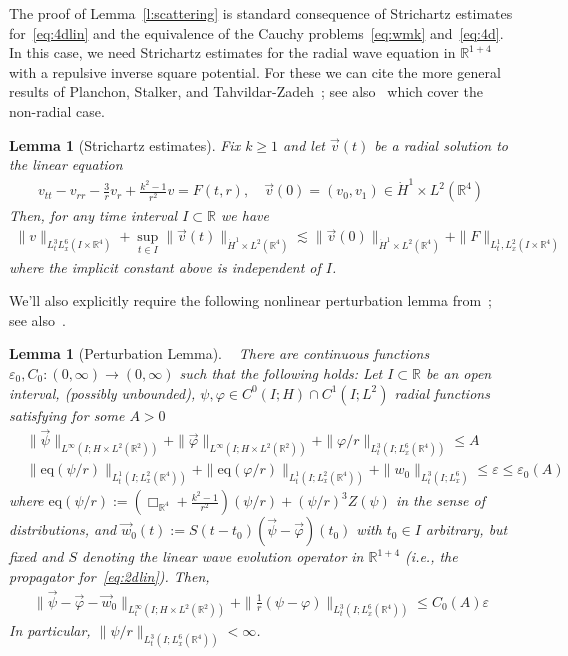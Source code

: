 \documentclass[10pt,reqno]{amsart}
\newcommand{\R}{\mathbb{R}}
\newcommand{\e}{\varepsilon}
\newcommand{\fy}{\varphi}
\newcommand{\I}{\infty}
\newcommand{\EQ}[1]{\begin{equation}\begin{split} #1 \end{split}\end{equation}}
\numberwithin{equation}{section}
\newtheorem{lem}[thm]{Lemma}
\theoremstyle{remark}
\newcommand{\0}{\emptyset}
\begin{document}
The proof of Lemma~\ref{l:scattering} is standard consequence of Strichartz estimates for~\eqref{eq:4dlin} and the equivalence of the Cauchy problems~\eqref{eq:wmk} and~\eqref{eq:4d}.  In this case, we need Strichartz estimates for the radial wave equation in $\R^{1+4}$ with a repulsive inverse square potential. For these we can cite the more general results of Planchon, Stalker, and Tahvildar-Zadeh~\cite{PST03b}; see also~\cite{BPST03, BPST04} which cover the non-radial case.  

\begin{lem}[Strichartz estimates]\emph{ \cite[Corollary 3.9]{PST03b}} \label{l:strich} Fix $k \ge 1$ and let $\vec v(t)$ be a radial solution to the linear equation 
\EQ{
v_{tt}  - v_{rr} - \frac{3}{r} v_r + \frac{k^2 -1}{r^2} v  = F(t, r), \quad \vec v(0) = (v_0, v_1) \in \dot{H}^1 \times L^2 (\R^4)
}
Then, for any time interval $I \subset \R$ we have 
\EQ{ \label{eq:strich} 
\| v \|_{L^{3}_t L^6_x(I \times \R^4)} + \sup_{t \in I}\| \vec v(t) \|_{\dot{H}^1 \times L^2(\R^4)} \lesssim   \| \vec v(0) \|_{\dot{H}^1 \times L^2(\R^4)} + \| F \|_{L^1_t, L^2_x(I \times \R^4)}
} 
where the implicit constant above is independent of $I$. 
\end{lem}  

 We'll also explicitly require the following nonlinear perturbation lemma from~\cite{KM08}; see also~\cite[Lemma 2.18]{CKLS1}. 
 \begin{lem}[Perturbation Lemma]\emph{\cite[Theorem $2.20$]{KM08}~\cite[Lemma 2.18]{CKLS1} \label{l:pert}} There are continuous functions $\e_0,  C_0: (0, \infty) \to (0, \infty)$ such that the following holds: Let $I\subset \R$ be an open interval, (possibly unbounded), $\psi, \fy \in C^0(I; H) \cap C^1(I; L^2) $ radial functions satisfying for some $A>0$ 
\begin{align*} 
&\|\vec \psi\|_{L^{\I}(I; H \times L^2(\R^2))}+ \|\vec\fy\|_{L^{\I}(I; H \times L^2(\R^2))}+ \|\fy/r\|_{L^3_t(I; L^6_x(\R^4))} \le A\\
&\|\textrm{eq}(\psi/r)\|_{L^1_t(I; L^2_x(\R^4))}+\|\textrm{eq}(\fy/r)\|_{L^1_t(I; L^2_x(\R^4))} + \|w_0\|_{L^3_t(I; L^6_x)} \le \e \le \e_0(A)
\end{align*} 
where $\textrm{eq}(\psi/r):= (\Box_{\R^4} + \frac{k^2-1}{r^2}) (\psi/r) +(\psi/r)^3Z(\psi)$ in the sense of distributions, and $\vec w_0(t):= S(t-t_0)(\vec \psi-\vec \fy)(t_0)$ with $t_0 \in I$ arbitrary, but fixed and $S$ denoting the linear wave evolution operator in $\R^{1+4}$ (i.e., the propagator for~\eqref{eq:2dlin}). Then,
\begin{align*} 
\|\vec \psi -\vec \fy - \vec w_0\|_{L^{\I}_t(I; H \times L^2(\R^2))} + \|\frac{1}{r}(\psi-\fy)\|_{L^3_t(I; L^6_x(\R^4))} \le C_0(A) \e
\end{align*} 
In particular, $\|\psi/r\|_{L^3_t(I; L^6_x(\R^4))} < \I$. 
\end{lem} 
\end{document}
